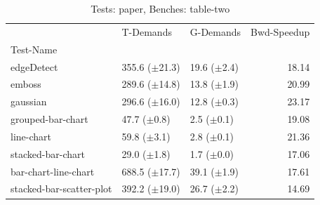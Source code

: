\begin{table}
\caption{Tests: paper, Benches: table-two}
\label{paper-table-two}
\begin{tabular}{lllr}
\toprule
 & T-Demands & G-Demands & Bwd-Speedup \\
Test-Name &  &  &  \\
\midrule
edgeDetect & 355.6 ($\pm$21.3) & 19.6 ($\pm$2.4) & 18.14 \\
emboss & 289.6 ($\pm$14.8) & 13.8 ($\pm$1.9) & 20.99 \\
gaussian & 296.6 ($\pm$16.0) & 12.8 ($\pm$0.3) & 23.17 \\
grouped-bar-chart & 47.7 ($\pm$0.8) & 2.5 ($\pm$0.1) & 19.08 \\
line-chart & 59.8 ($\pm$3.1) & 2.8 ($\pm$0.1) & 21.36 \\
stacked-bar-chart & 29.0 ($\pm$1.8) & 1.7 ($\pm$0.0) & 17.06 \\
bar-chart-line-chart & 688.5 ($\pm$17.7) & 39.1 ($\pm$1.9) & 17.61 \\
stacked-bar-scatter-plot & 392.2 ($\pm$19.0) & 26.7 ($\pm$2.2) & 14.69 \\
\bottomrule
\end{tabular}
\end{table}
